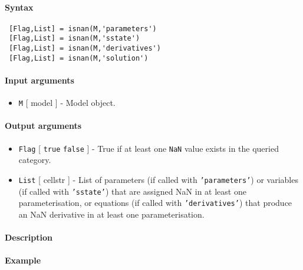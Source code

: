


	\paragraph{Syntax}
 
 \begin{verbatim}
 [Flag,List] = isnan(M,'parameters')
 [Flag,List] = isnan(M,'sstate')
 [Flag,List] = isnan(M,'derivatives')
 [Flag,List] = isnan(M,'solution')
 \end{verbatim}
 
 \paragraph{Input arguments}
 
 \begin{itemize}
 \item
   \texttt{M} {[} model {]} - Model object.
 \end{itemize}
 
 \paragraph{Output arguments}
 
 \begin{itemize}
 \item
   \texttt{Flag} {[} \texttt{true} \textbar{} \texttt{false} {]} - True
   if at least one \texttt{NaN} value exists in the queried category.
 \item
   \texttt{List} {[} cellstr {]} - List of parameters (if called with
   \texttt{'parameters'}) or variables (if called with \texttt{'sstate'})
   that are assigned NaN in at least one parameterisation, or equations
   (if called with \texttt{'derivatives'}) that produce an NaN derivative
   in at least one parameterisation.
 \end{itemize}
 
 \paragraph{Description}
 
 \paragraph{Example}


